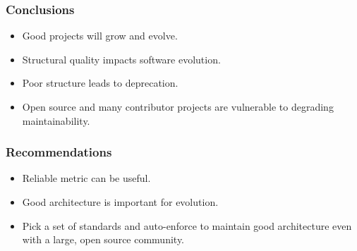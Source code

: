 \documentclass{beamer}
\begin{document}
\begin{frame}
  \frametitle{Conclusions}
  \begin{itemize}
    \item Good projects will grow and evolve.
    
    \vspace{0.35cm}
    \item Structural quality impacts software evolution.
    
    \vspace{0.35cm}
    \item Poor structure leads to deprecation.
    
    \vspace{0.35cm}
    \item Open source and many contributor projects are vulnerable to degrading maintainability.
  \end{itemize}
\end{frame}

\begin{frame}
  \frametitle{Recommendations}
  \begin{itemize}
    \item Reliable metric can be useful.
    
    \vspace{0.35cm}
    \item Good architecture is important for evolution.
    
    \vspace{0.35cm}
    \item Pick a set of standards and auto-enforce to maintain good architecture even with a large, open source community.
  \end{itemize}
\end{frame}
\end{document}

